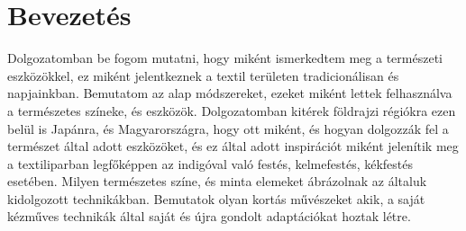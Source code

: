 \chapter{Bevezetés}
Dolgozatomban be fogom mutatni, hogy miként ismerkedtem  meg a természeti eszközökkel, ez miként jelentkeznek a textil területen tradicionálisan és napjainkban.
Bemutatom az alap módszereket, ezeket miként lettek felhasználva a természetes színeke, és eszközök.
Dolgozatomban kitérek földrajzi régiókra ezen belül is Japánra, és Magyarországra, hogy ott miként, és hogyan dolgozzák fel a természet által adott eszközöket, és ez által adott inspirációt miként jelenítik meg a textiliparban legfőképpen az indigóval való festés, kelmefestés, kékfestés esetében.
Milyen természetes színe, és minta elemeket ábrázolnak az általuk kidolgozott technikákban.
Bemutatok olyan kortás művészeket akik, a saját kézműves technikák által saját és újra gondolt adaptációkat hoztak létre.